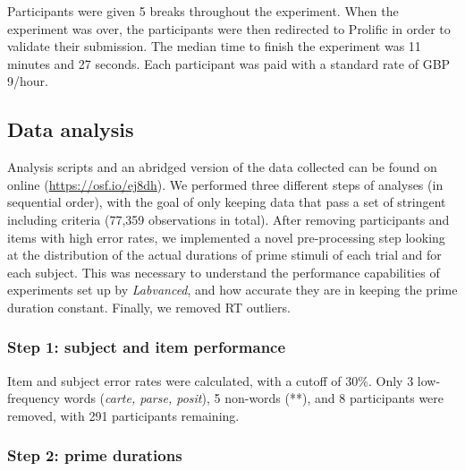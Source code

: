 \documentclass[
]{interact}
\begin{document}
Participants were given 5 breaks throughout the experiment. When the
experiment was over, the participants were then redirected to Prolific
in order to validate their submission. The median time to finish the
experiment was 11 minutes and 27 seconds. Each participant was paid with
a standard rate of GBP 9/hour.

\subsection{Data analysis}\label{sec-exp1-analysis}

Analysis scripts and an abridged version of the data collected can be
found on online (\url{https://osf.io/ej8dh}). We performed three
different steps of analyses (in sequential order), with the goal of only
keeping data that pass a set of stringent including criteria (77,359
observations in total). After removing participants and items with high
error rates, we implemented a novel pre-processing step looking at the
distribution of the actual durations of prime stimuli of each trial and
for each subject. This was necessary to understand the performance
capabilities of experiments set up by \emph{Labvanced}, and how accurate
they are in keeping the prime duration constant. Finally, we removed RT
outliers.

\subsubsection{Step 1: subject and item
performance}\label{sec-exp1-analysis-performance}

Item and subject error rates were calculated, with a cutoff of 30\%.
Only 3 low-frequency words (\emph{carte, parse, posit}), 5 non-words
(**), and 8 participants were removed, with 291 participants remaining.

\subsubsection{Step 2: prime
durations}\label{sec-exp1-analysis-primeTime}
\end{document}
